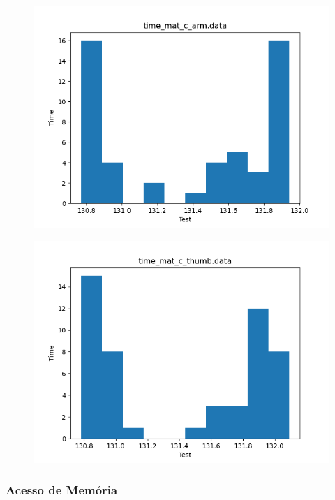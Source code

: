 \documentclass[a4paper,10pt]{article}
\begin{document}
\begin{figure}[H]
 \includegraphics[width=\linewidth]{data/time_mat_c_arm_histogram.png}
\end{figure}

\begin{figure}[H]
 \includegraphics[width=\linewidth]{data/time_mat_c_thumb_histogram.png}
\end{figure}

\subsubsection*{Acesso de Memória}
\end{document}

